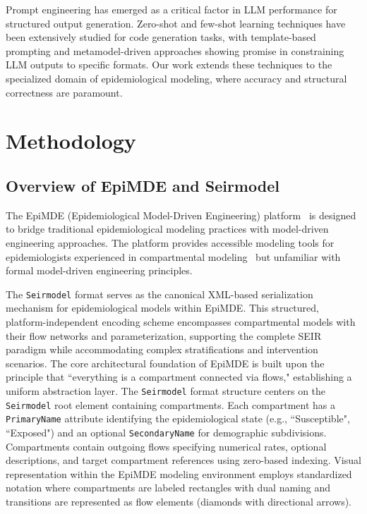 \documentclass[conference]{IEEEtran}
\begin{document}
Prompt engineering has emerged as a critical factor in LLM performance for structured output generation. Zero-shot and few-shot learning techniques have been extensively studied for code generation tasks, with template-based prompting and metamodel-driven approaches showing promise in constraining LLM outputs to specific formats. Our work extends these techniques to the specialized domain of epidemiological modeling, where accuracy and structural correctness are paramount.

\section{Methodology}
\subsection{Overview of EpiMDE and Seirmodel}

The EpiMDE (Epidemiological Model-Driven Engineering) platform~\cite{b1} is designed to bridge traditional epidemiological modeling practices with model-driven engineering approaches. The platform provides accessible modeling tools for epidemiologists experienced in compartmental modeling~\cite{b2} but unfamiliar with formal model-driven engineering principles.

The \texttt{Seirmodel} format serves as the canonical XML-based serialization mechanism for epidemiological models within EpiMDE. This structured, platform-independent encoding scheme encompasses compartmental models with their flow networks and parameterization, supporting the complete SEIR paradigm while accommodating complex stratifications and intervention scenarios. The core architectural foundation of EpiMDE is built upon the principle that ``everything is a compartment connected via flows," establishing a uniform abstraction layer. The \texttt{Seirmodel} format structure centers on the \texttt{Seirmodel} root element containing compartments. Each compartment has a \texttt{PrimaryName} attribute identifying the epidemiological state (e.g., ``Susceptible", ``Exposed") and an optional \texttt{SecondaryName} for demographic subdivisions. Compartments contain outgoing flows specifying numerical rates, optional descriptions, and target compartment references using zero-based indexing. Visual representation within the EpiMDE modeling environment employs standardized notation where compartments are labeled rectangles with dual naming and transitions are represented as flow elements (diamonds with directional arrows).
\end{document}
